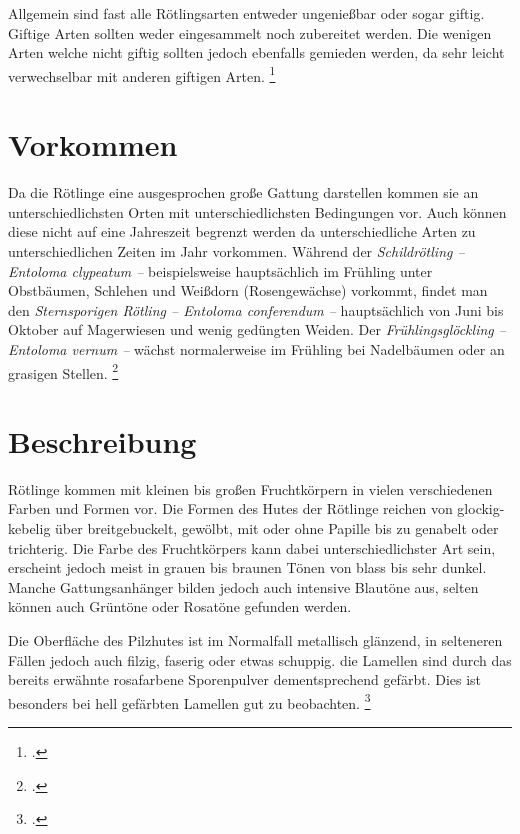\documentclass[a4paper,abstracton]{scrreprt}
\begin{document}
Allgemein sind fast alle Rötlingsarten entweder ungenießbar oder sogar giftig. Giftige Arten sollten weder eingesammelt noch zubereitet werden. Die wenigen Arten welche nicht giftig sollten jedoch ebenfalls gemieden werden, da sehr leicht verwechselbar mit anderen giftigen Arten. \footcite{kosmos}

\section{Vorkommen}
Da die Rötlinge eine ausgesprochen große Gattung darstellen kommen sie an unterschiedlichsten Orten mit unterschiedlichsten Bedingungen vor. Auch können diese nicht auf eine Jahreszeit begrenzt werden da unterschiedliche Arten zu unterschiedlichen Zeiten im Jahr vorkommen. Während der \emph{Schildrötling -- Entoloma clypeatum --} beispielsweise hauptsächlich im Frühling unter Obstbäumen, Schlehen und Weißdorn (Rosengewächse) vorkommt, findet man den \emph{Sternsporigen Rötling -- Entoloma conferendum --} hauptsächlich von Juni bis Oktober auf Magerwiesen und wenig gedüngten Weiden. Der \emph{Frühlingsglöckling -- Entoloma vernum --} wächst normalerweise im Frühling bei Nadelbäumen oder an grasigen Stellen. 
\footcite{naturfuehrer} 
\section{Beschreibung}
Rötlinge kommen mit kleinen bis großen Fruchtkörpern in vielen verschiedenen Farben und Formen vor. Die Formen des Hutes der Rötlinge reichen von glockig-kebelig über breitgebuckelt, gewölbt, mit oder ohne Papille bis zu genabelt oder trichterig. Die Farbe des Fruchtkörpers kann dabei unterschiedlichster Art sein, erscheint jedoch meist in grauen bis braunen Tönen von blass bis sehr dunkel. Manche Gattungsanhänger bilden jedoch auch intensive Blautöne aus, selten können auch Grüntöne oder Rosatöne gefunden werden. 

Die Oberfläche des Pilzhutes ist im Normalfall metallisch glänzend, in selteneren Fällen jedoch auch filzig, faserig oder etwas schuppig. die Lamellen sind durch das bereits erwähnte rosafarbene Sporenpulver dementsprechend gefärbt. Dies ist besonders bei hell gefärbten Lamellen gut zu beobachten.
\footcite{beschreibung}
\end{document}

